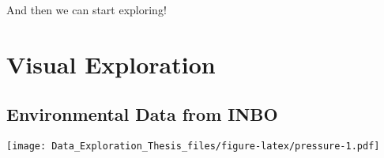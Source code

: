 \documentclass[]{article}
\newenvironment{Shaded}{\begin{snugshade}}{\end{snugshade}}
\newcommand{\KeywordTok}[1]{\textcolor[rgb]{0.13,0.29,0.53}{\textbf{#1}}}
\newcommand{\StringTok}[1]{\textcolor[rgb]{0.31,0.60,0.02}{#1}}
\newcommand{\OperatorTok}[1]{\textcolor[rgb]{0.81,0.36,0.00}{\textbf{#1}}}
\newcommand{\NormalTok}[1]{#1}
\begin{document}
\begin{Shaded}
\end{Shaded}

And then we can start exploring!

\section{Visual Exploration}\label{visual-exploration}

\subsection{Environmental Data from
INBO}\label{environmental-data-from-inbo}

\texttt{[image: Data\_Exploration\_Thesis\_files/figure-latex/pressure-1.pdf]}
\end{document}
